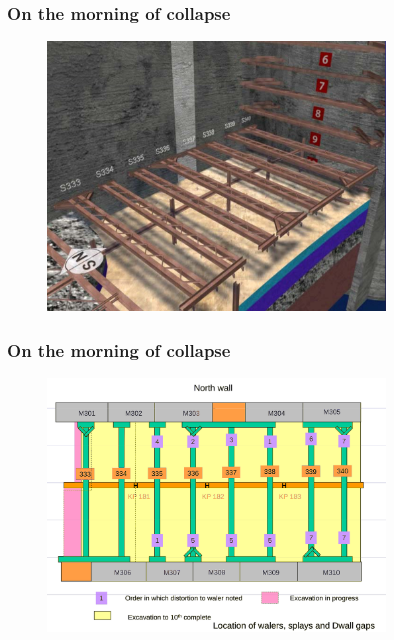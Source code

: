 \documentclass[handout]{beamer}
\begin{document}
\begin{frame}
\frametitle{On the morning of collapse}
\begin{figure}[ht]
	\centering
	\includegraphics[width=0.8\textwidth]{figs/observation-morning-collapse.png}
\end{figure}
\end{frame}

\begin{frame}
\frametitle{On the morning of collapse}
\begin{figure}[ht]
	\centering
	\includegraphics[width=0.8\textwidth]{figs/splays-dwall-gaps.png}
\end{figure}
\end{frame}
\end{document}
